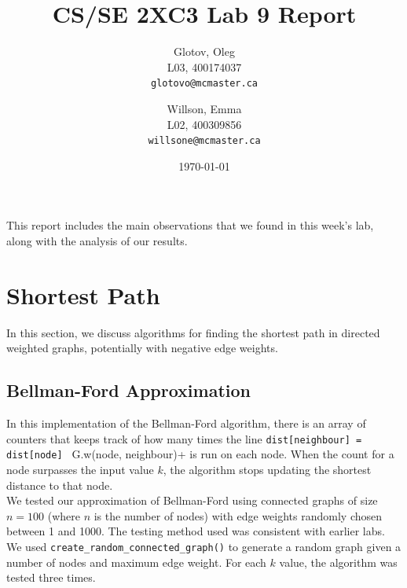 \documentclass[12pt]{article}
\title{CS/SE 2XC3 Lab 9 Report}
\author{
  Glotov, Oleg\\ L03, 400174037\\
  \texttt{glotovo@mcmaster.ca}
  \and
  Willson, Emma\\ L02, 400309856\\
  \texttt{willsone@mcmaster.ca}
  }
\date{\today}
\begin{document}
\maketitle

This report includes the main observations that we found in this week's lab, along with the analysis of our results.

\newpage 
\section{Shortest Path}
In this section, we discuss algorithms for finding the shortest path in directed weighted graphs, potentially with negative edge weights. 
\subsection{Bellman-Ford Approximation}
In this implementation of the Bellman-Ford algorithm, there is an array of counters that keeps track of how many times the line \verb+dist[neighbour] = dist[node] + G.w(node, neighbour)+ is run on each node. When the count for a node surpasses the input value $k$, the algorithm stops updating the shortest distance to that node.\\
We tested our approximation of Bellman-Ford using connected graphs of size $n=100$ (where $n$ is the number of nodes) with edge weights randomly chosen between 1 and 1000.
The testing method used was consistent with earlier labs. We used \verb+create_random_connected_graph()+ to generate a random graph given a number of nodes and maximum edge weight. For each $k$ value, the algorithm was tested three times.
\end{document}
